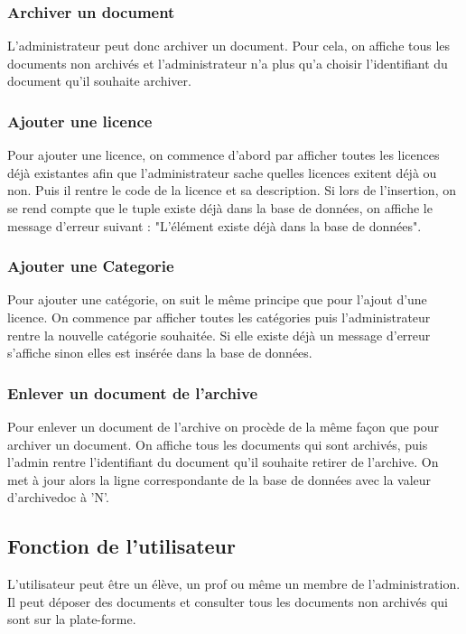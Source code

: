 \documentclass[11pt]{report}
\begin{document}
\subsubsection{Archiver un document}

L'administrateur peut donc archiver un document. Pour cela, on affiche tous les documents non archivés et l'administrateur n'a plus qu'a choisir l'identifiant du document qu'il souhaite archiver.

\subsubsection{Ajouter une licence}

Pour ajouter une licence, on commence d'abord par afficher toutes les licences déjà existantes afin que l'administrateur sache quelles licences exitent déjà ou non. Puis il rentre le code de la licence et sa description. Si lors de l'insertion, on se rend compte que le tuple existe déjà dans la base de données, on affiche le message d'erreur suivant : "L'élément existe déjà dans la base de données".

\subsubsection{Ajouter une Categorie}

Pour ajouter une catégorie, on suit le même principe que pour l'ajout d'une licence. On commence par afficher toutes les catégories puis l'administrateur rentre la nouvelle catégorie souhaitée. Si elle existe déjà un message d'erreur s'affiche sinon elles est insérée dans la base de données.

\subsubsection{Enlever un document de l'archive}

Pour enlever un document de l'archive on procède de la même façon que pour archiver un document. On affiche tous les documents qui sont archivés, puis l'admin rentre l'identifiant du document qu'il souhaite retirer de l'archive. On met à jour alors la ligne correspondante de la base de données avec la valeur d'archivedoc à 'N'.

\subsection{Fonction de l'utilisateur}

L'utilisateur peut être un élève, un prof ou même un membre de l'administration. Il peut déposer des documents et consulter tous les documents non archivés qui sont sur la plate-forme.
\end{document}
